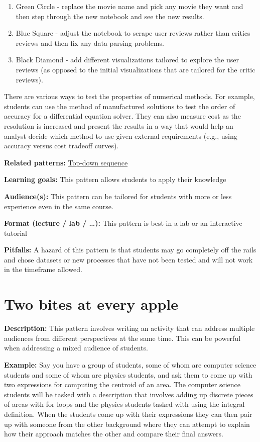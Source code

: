 \documentclass[]{book}
\providecommand{\tightlist}{%
  \setlength{\itemsep}{0pt}\setlength{\parskip}{0pt}}
\begin{document}
\begin{enumerate}
\def\labelenumi{\arabic{enumi}.}
\tightlist
\item
  Green Circle - replace the movie name and pick any movie they want and
  then step through the new notebook and see the new results.
\item
  Blue Square - adjust the notebook to scrape user reviews rather than
  critics reviews and then fix any data parsing problems.
\item
  Black Diamond - add different visualizations tailored to explore the
  user reviews (as opposed to the initial visualizations that are
  tailored for the critic reviews).
\end{enumerate}

There are various ways to test the properties of numerical methods. For
example, students can use the method of manufactured solutions to test
the order of accuracy for a differential equation solver. They can also
measure cost as the resolution is increased and present the results in a
way that would help an analyst decide which method to use given external
requirements (e.g., using accuracy versus cost tradeoff curves).

\textbf{Related patterns:}
\protect\hyperlink{top-down-sequence}{Top-down sequence}

\textbf{Learning goals:} This pattern allows students to apply their
knowledge

\textbf{Audience(s):} This pattern can be tailored for students with
more or less experience even in the same course.

\textbf{Format (lecture / lab / \ldots{}):} This pattern is best in a
lab or an interactive tutorial

\textbf{Pitfalls:} A hazard of this pattern is that students may go
completely off the rails and chose datasets or new processes that have
not been tested and will not work in the timeframe allowed.

\section{Two bites at every apple}\label{two-bites-at-every-apple}

\textbf{Description:} This pattern involves writing an activity that can
address multiple audiences from different perspectives at the same time.
This can be powerful when addressing a mixed audience of students.

\textbf{Example:} Say you have a group of students, some of whom are
computer science students and some of whom are physics students, and ask
them to come up with two expressions for computing the centroid of an
area. The computer science students will be tasked with a description
that involves adding up discrete pieces of areas with for loops and the
physics students tasked with using the integral definition. When the
students come up with their expressions they can then pair up with
someone from the other background where they can attempt to explain how
their approach matches the other and compare their final answers.
\end{document}
